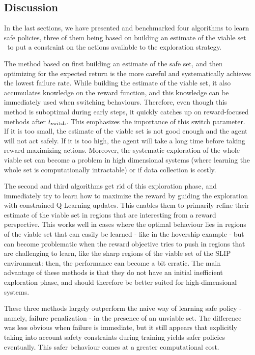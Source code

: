 \subsection{Discussion}
In the last sections, we have presented and benchmarked four algorithms to learn safe policies, three of them being based on building an estimate of the viable set \QV~to put a constraint on the actions available to the exploration strategy.\par
The method based on first building an estimate of the safe set, and then optimizing for the expected return is the more careful and systematically achieves the lowest failure rate. While building the estimate of the viable set, it also accumulates knowledge on the reward function, and this knowledge can be immediately used when switching behaviours. Therefore, even though this method is suboptimal during early steps, it quickly catches up on reward-focused methods after $t_\text{switch}$. This emphasizes the importance of this switch parameter. If it is too small, the estimate of the viable set is not good enough and the agent will not act safely. If it is too high, the agent will take a long time before taking reward-maximizing actions. Moreover, the systematic exploration of the whole viable set can become a problem in high dimensional systems (where learning the whole set is computationally intractable) or if data collection is costly. \par
The second and third algorithms get rid of this exploration phase, and immediately try to learn how to maximize the reward by guiding the exploration with constrained Q-Learning updates. This enables them to primarily refine their estimate of the viable set in regions that are interesting from a reward perspective. This works well in cases where the optimal behaviour lies in regions of the viable set that can easily be learned - like in the hovership example - but can become problematic when the reward objective tries to push in regions that are challenging to learn, like the sharp regions of the viable set of the SLIP environment: then, the performance can become a bit erratic. The main advantage of these methods is that they do not have an initial inefficient exploration phase, and should therefore be better suited for high-dimensional systems.\par
These three methods largely outperform the naive way of learning safe policy - namely, failure penalization - in the presence of an unviable set. The difference was less obvious when failure is immediate, but it still appears that explicitly taking into account safety constraints during training yields safer policies eventually. This safer behaviour comes at a greater computational cost.\par